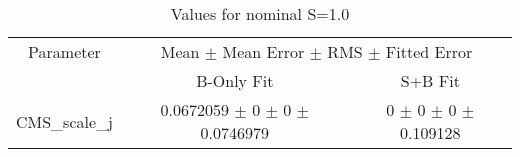 \begin{table}
\centering
\caption{Values for nominal S=1.0}
\begin{tabular}{ccc}
\toprule
Parameter & \multicolumn{2}{c}{Mean $\pm$ Mean Error $\pm$ RMS $\pm$ Fitted Error}\\
 & B-Only Fit & S+B Fit\\
\midrule
CMS\_scale\_j & \num{0.0672059} $\pm$ \num{0} $\pm$ \num{0} $\pm$ \num{0.0746979} & \num{0} $\pm$ \num{0} $\pm$ \num{0} $\pm$ \num{0.109128}\\
\bottomrule
\end{tabular}
\end{table}